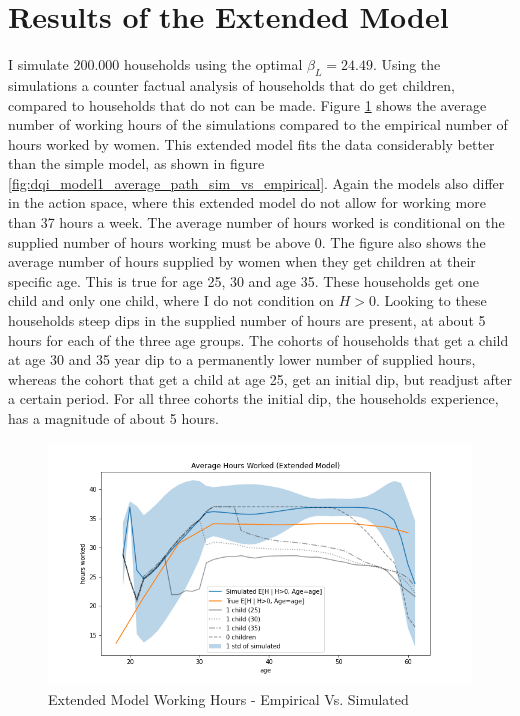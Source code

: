 \section{Results of the Extended Model}

I simulate 200.000 households using the optimal $\beta_L = 24.49$. Using the simulations a counter factual analysis of households that do get children, compared to households that do not can be made. Figure \ref{fig:ext_model_working_hours} shows the average number of working hours of the simulations compared to the empirical number of hours worked by women. This extended model fits the data considerably better than the simple model, as shown in figure \ref{fig:dqi_model1_average_path_sim_vs_empirical}. Again the models also differ in the action space, where this extended model do not allow for working more than 37 hours a week. The average number of hours worked is conditional on the supplied number of hours working must be above 0. The figure also shows the average number of hours supplied by women when they get children at their specific age. This is true for age 25, 30 and age 35. These households get one child and only one child, where I do not condition on $H>0$. Looking to these households steep dips in the supplied number of hours are present, at about 5 hours for each of the three age groups. The cohorts of households that get a child at age 30 and 35 year dip to a permanently lower number of supplied hours, whereas the cohort that get a child at age 25, get an initial dip, but readjust after a certain period. For all three cohorts the initial dip, the households experience, has a magnitude of about 5 hours.

\begin{figure}
    \centering
    \includegraphics[scale=0.4]{figures/extended_model_average_hours.png}
    \caption{Extended Model Working Hours - Empirical Vs. Simulated}
    \label{fig:ext_model_working_hours}
\end{figure}


